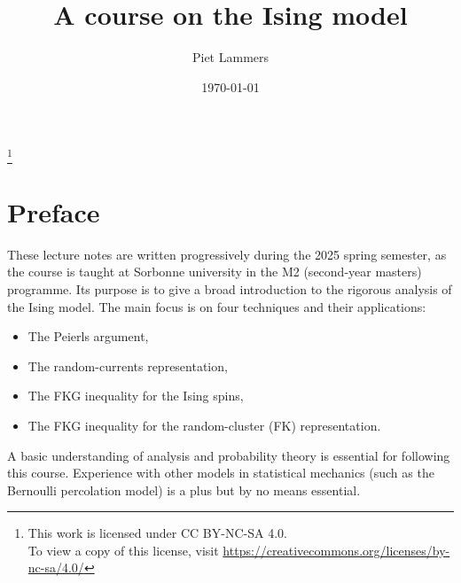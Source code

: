 % 


\makeatletter
{}
\makeatother


\title{A course on the Ising model}


\author{Piet Lammers}
\address{CNRS and Sorbonne Université, LPSM}

\date{\today}

\newcommand\n{\mathbf{n}}
\newcommand\m{\mathbf{m}}
\newcommand\s{\mathbf{s}}
\renewcommand\a{\mathbf{a}}
\renewcommand\b{\mathbf{b}}
\newcommand\f{{\operatorname{f}}}
\newcommand\bfM{\mathbf{M}}

\thanks{This work is licensed under CC BY-NC-SA 4.0.\\\indent To view a copy of this license, visit \url{https://creativecommons.org/licenses/by-nc-sa/4.0/}}




\maketitle

\tableofcontents


\section*{Preface}
These lecture notes are written progressively during the 2025 spring semester,
as the course is taught at Sorbonne university in the M2 (second-year masters) programme.
Its purpose is to give a broad introduction to the rigorous analysis of the Ising model.
The main focus is on four techniques and their applications:
\begin{itemize}
    \item The Peierls argument,
    \item The random-currents representation,
    \item The FKG inequality for the Ising spins,
    \item The FKG inequality for the random-cluster (FK) representation.
\end{itemize}

A basic understanding of analysis and probability theory is essential for following this course.
Experience with other models in statistical mechanics (such as the Bernoulli percolation model)
is a plus but by no means essential.

